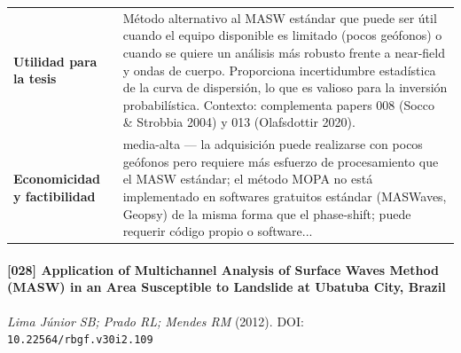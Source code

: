 \begin{center}
\begin{tabularx}{\textwidth}{@{}>{\bfseries}p{3.3cm} X@{}}
Utilidad para la tesis & Método alternativo al MASW estándar que puede ser útil cuando el equipo disponible es limitado (pocos geófonos) o cuando se quiere un análisis más robusto frente a near-field y ondas de cuerpo. Proporciona incertidumbre estadística de la curva de dispersión, lo que es valioso para la inversión probabilística. Contexto: complementa papers 008 (Socco \& Strobbia 2004) y 013 (Olafsdottir 2020). \\
Economicidad y factibilidad & media-alta --- la adquisición puede realizarse con pocos geófonos pero requiere más esfuerzo de procesamiento que el MASW estándar; el método MOPA no está implementado en softwares gratuitos estándar (MASWaves, Geopsy) de la misma forma que el phase-shift; puede requerir código propio o software... \\
\bottomrule
\end{tabularx}
\end{center}

\paragraph{[028] Application of Multichannel Analysis of Surface Waves Method (MASW) in an Area Susceptible to Landslide at Ubatuba City, Brazil} \emph{Lima Júnior SB; Prado RL; Mendes RM} (2012).
{\scriptsize DOI: \texttt{10.22564/rbgf.v30i2.109}}

